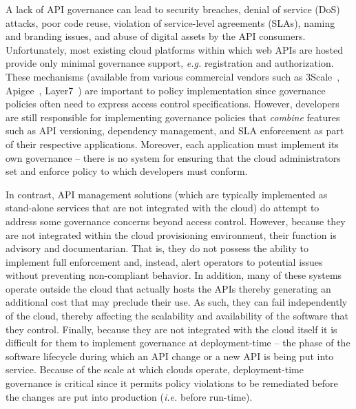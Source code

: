A lack of API governance can lead to 
security breaches, denial of service (DoS)
attacks, poor code reuse, violation of service-level agreements (SLAs), 
naming and branding issues, and abuse of digital 
assets by the API consumers. Unfortunately, most existing cloud platforms
within which web APIs are hosted provide only minimal governance support, {\em
e.g.}
registration and authorization.  These mechanisms
(available from various commercial vendors such as
3Scale~\cite{3scale}, Apigee~\cite{apigee},
Layer7~\cite{layer7})
are important to policy implementation since governance policies often need to
express access control specifications.  
However, developers are still responsible for implementing governance policies
that {\em combine} features such as API versioning, 
dependency management, and SLA enforcement as part of their respective
applications.  Moreover, each application must
implement its own governance -- there is no system for ensuring that the
cloud administrators set and enforce policy to which developers must conform.

In contrast, API management solutions (which are typically implemented as
stand-alone services that are not integrated with the cloud) do attempt to
address some governance concerns beyond access control.  However, because they
are not integrated within the cloud provisioning environment, their function is
advisory and documentarian.  That is, they 
do not possess the ability to implement full enforcement and, instead, alert
operators to potential issues without preventing non-compliant behavior.
In addition, many of these systems operate outside the 
cloud that actually hosts the APIs thereby generating an additional cost that
may preclude their use.
As such, they can fail independently of the cloud, thereby affecting 
the scalability and availability of the software that they control.
Finally, because they are not integrated with the cloud itself it is difficult
for them to
implement governance at deployment-time -- the phase of the software lifecycle
during which an API change or a new API is being put into service.
Because of the scale at which clouds operate, deployment-time governance is
critical since it permits policy violations to be remediated before the
changes are put into production ({\em i.e.} before run-time).

